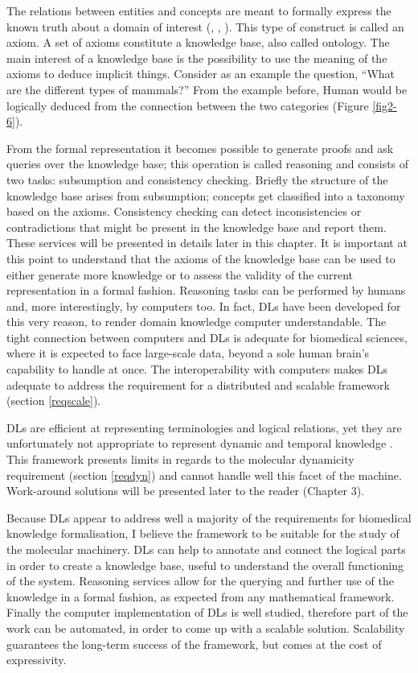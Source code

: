 The relations between entities and concepts are meant to formally express the known truth about a domain of interest (\cite{stevens2007using}, \cite{krotzsch2012owl}, \cite{hitzler2009owl}). This type of construct is called an axiom. A set of axioms constitute a knowledge base, also called ontology. The main interest of a knowledge base is the possibility to use the meaning of the axioms to deduce implicit things. Consider as an example the question, “What are the different types of mammals?” From the example before, Human would be logically deduced from the connection between the two categories (Figure \ref{fig2-6}).

From the formal representation it becomes possible to generate proofs and ask queries over the knowledge base; this operation is called reasoning and consists of two tasks: subsumption and consistency checking. Briefly the structure of the knowledge base arises from subsumption; concepts get classified into a taxonomy based on the axioms. Consistency checking can detect inconsistencies or contradictions that might be present in the knowledge base and report them. These services will be presented in details later in this chapter. It is important at this point to understand that the axioms of the knowledge base can be used to either generate more knowledge or to assess the validity of the current representation in a formal fashion. Reasoning tasks can be performed by humans and, more interestingly, by computers too. In fact, DLs have been developed for this very reason, to render domain knowledge computer understandable. The tight connection between computers and DLs is adequate for biomedical sciences, where it is expected to face large-scale data, beyond a sole human brain’s capability to handle at once. The interoperability with computers makes DLs adequate to address the requirement for a distributed and scalable framework (section \ref{reqscale}).

DLs are efficient at representing terminologies and logical relations, yet they are unfortunately not appropriate to represent dynamic and temporal knowledge \citep{kim2008temporal}. This framework presents limits in regards to the molecular dynamicity requirement (section \ref{reqdyn}) and cannot handle well this facet of the machine. Work-around solutions will be presented later to the reader (Chapter 3).

Because DLs appear to address well a majority of the requirements for biomedical knowledge formalisation, I believe the framework to be suitable for the study of the molecular machinery. DLs can help to annotate and connect the logical parts in order to create a knowledge base, useful to understand the overall functioning of the system. Reasoning services allow for the querying and further use of the knowledge in a formal fashion, as expected from any mathematical framework. Finally the computer implementation of DLs is well studied, therefore part of the work can be automated, in order to come up with a scalable solution. Scalability guarantees the long-term success of the framework, but comes at the cost of expressivity.

